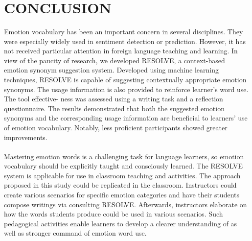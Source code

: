 \documentclass[a4paper,12pt,oneside]{article}
\begin{document}
\newpage
\section{CONCLUSION}
\paragraph{}
Emotion vocabulary has been an important concern in several disciplines. They were especially widely used in sentiment detection or prediction. However, it has not received particular attention in foreign language teaching and learning. In view of the paucity of research, we developed RESOLVE, a context-based emotion synonym suggestion system. Developed using machine learning techniques, RESOLVE is capable of suggesting contextually appropriate emotion synonyms. The usage information is also provided to reinforce learner’s word use. The tool effective- ness was assessed using a writing task and a reflection questionnaire. The results demonstrated that both the suggested emotion synonyms and the corresponding usage information are beneficial to learners’ use of emotion vocabulary. Notably, less proficient participants showed greater improvements.
\paragraph{}
Mastering emotion words is a challenging task for language learners, so emotion vocabulary should be explicitly taught and consciously learned. The RESOLVE system is applicable for use in classroom teaching and activities. The approach proposed in this study could be replicated in the classroom. Instructors could create various scenarios for specific emotion categories and have their students compose writings via consulting RESOLVE. Afterwards, instructors elaborate on how the words students produce could be used in various scenarios. Such pedagogical activities enable learners to develop a clearer understanding of as well as stronger command of emotion word use. 

\newpage
\end{document}
